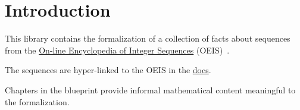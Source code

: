 \chapter{Introduction}\label{introduction}

This library contains the formalization of a collection of facts about sequences from 
the \href{https://oeis.org}{On-line Encyclopedia of Integer Sequences} (OEIS)~\cite{oeis}.

The sequences are hyper-linked to the OEIS in the 
\href{https://provables.github.io/docs/Sequencelib/Basic.html}{docs}.

Chapters in the blueprint provide informal mathematical content meaningful to the
formalization.

